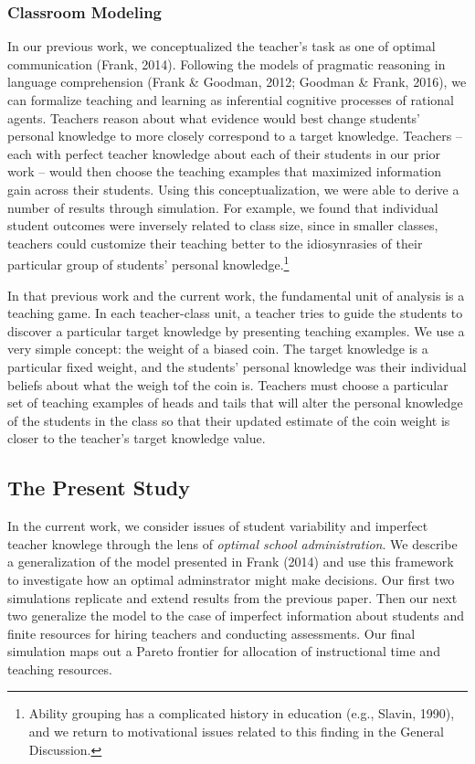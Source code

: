 \documentclass[10pt, letterpaper]{apa6}
\begin{document}
\subsubsection{Classroom Modeling}\label{classroom-modeling}

In our previous work, we conceptualized the teacher's task as one of
optimal communication (Frank, 2014). Following the models of pragmatic
reasoning in language comprehension (Frank \& Goodman, 2012; Goodman \&
Frank, 2016), we can formalize teaching and learning as inferential
cognitive processes of rational agents. Teachers reason about what
evidence would best change students' personal knowledge to more closely
correspond to a target knowledge. Teachers -- each with perfect teacher
knowledge about each of their students in our prior work -- would then
choose the teaching examples that maximized information gain across
their students. Using this conceptualization, we were able to derive a
number of results through simulation. For example, we found that
individual student outcomes were inversely related to class size, since
in smaller classes, teachers could customize their teaching better to
the idiosynrasies of their particular group of students' personal
knowledge.\footnote{Ability grouping has a complicated history in
  education (e.g., Slavin, 1990), and we return to motivational issues
  related to this finding in the General Discussion.}

In that previous work and the current work, the fundamental unit of
analysis is a teaching game. In each teacher-class unit, a teacher tries
to guide the students to discover a particular target knowledge by
presenting teaching examples. We use a very simple concept: the weight
of a biased coin. The target knowledge is a particular fixed weight, and
the students' personal knowledge was their individual beliefs about what
the weigh tof the coin is. Teachers must choose a particular set of
teaching examples of heads and tails that will alter the personal
knowledge of the students in the class so that their updated estimate of
the coin weight is closer to the teacher's target knowledge value.

\subsection{The Present Study}\label{the-present-study}

In the current work, we consider issues of student variability and
imperfect teacher knowlege through the lens of \emph{optimal school
administration}. We describe a generalization of the model presented in
Frank (2014) and use this framework to investigate how an optimal
adminstrator might make decisions. Our first two simulations replicate
and extend results from the previous paper. Then our next two generalize
the model to the case of imperfect information about students and finite
resources for hiring teachers and conducting assessments. Our final
simulation maps out a Pareto frontier for allocation of instructional
time and teaching resources.
\end{document}
